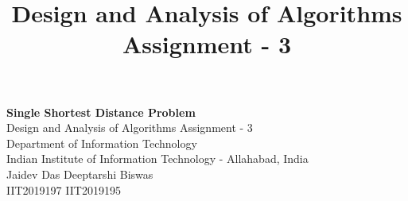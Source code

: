 \documentclass[10pt]{article}
\author{}
\title{\Large{Design and Analysis of Algorithms Assignment - 3}}
\begin{document}
	\begin{center}
		{\Large \textbf{Single Shortest Distance Problem}}\\
			\vspace{1em}
		{\large Design and Analysis of Algorithms Assignment - 3 }\\
		\vspace{1em}
		{\large Department of Information Technology}\\
		\vspace{1em}
		\large{Indian Institute of Information Technology - Allahabad, India}\\
		\vspace{1em}
		\large{Jaidev Das \hspace{7em} Deeptarshi Biswas }\\
		\large{IIT2019197 \hspace{10em} IIT2019195} 
		
		\vspace{2.5em}
	\end{center}
	
\end{document}
